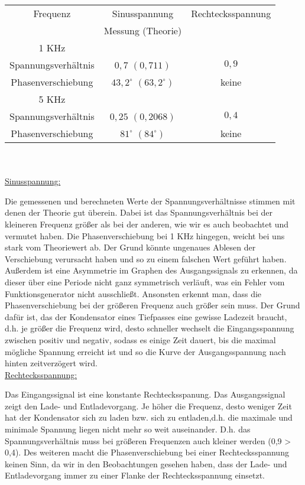 \documentclass[paper=a4, fontsize=11pt]{scrartcl}
\numberwithin{equation}{section}
\numberwithin{figure}{section}
\numberwithin{table}{section}
\begin{document}
\begin{tabular}{|c|c|c|}
\hline
Frequenz & Sinusspannung & Rechtecksspannung \\
 & Messung (Theorie)&  \\
\hline
1 KHz & & \\  
Spannungsverhältnis & $0,7$ $(0,711)$  & $0,9$ \\
Phasenverschiebung & $43,2^{\circ}$ $(63,2^{\circ})$ & keine \\
\hline
5 KHz & & \\
Spannungsverhältnis & $0,25$ $(0,2068)$ & $0,4$ \\
Phasenverschiebung & $81^{\circ}$ $(84^{\circ})$ & keine \\
\hline
\end{tabular} \\

\\

\underline{Sinusspannung:}

Die gemessenen und berechneten Werte der Spannungsverhältnisse stimmen mit denen der Theorie gut überein. Dabei ist das Spannungsverhältnis bei der kleineren Frequenz größer als bei der anderen, wie wir es auch beobachtet und vermutet haben. Die Phasenverschiebung bei 1 KHz hingegen, weicht bei uns stark vom Theoriewert ab. Der Grund könnte ungenaues Ablesen der Verschiebung verursacht haben und so zu einem falschen Wert geführt haben. Außerdem ist eine Asymmetrie im Graphen des Ausgangssignals zu erkennen, da dieser über eine Periode nicht ganz symmetrisch verläuft, was ein Fehler vom Funktionsgenerator nicht ausschließt. Ansonsten erkennt man, dass die Phasenverschiebung bei der größeren Frequenz auch größer sein muss. Der Grund dafür ist, das der Kondensator eines Tiefpasses eine gewisse Ladezeit braucht, d.h. je größer die Frequenz wird, desto schneller wechselt die Eingangsspannung zwischen positiv und negativ, sodass es einige Zeit dauert, bis die maximal mögliche Spannung erreicht ist und so die Kurve der Ausgangsspannung nach hinten zeitverzögert wird. \\

\underline{Rechtecksspannung:}

Das Eingangssignal ist eine konstante Rechtecksspanung. Das Ausgangssignal zeigt den Lade- und Entladevorgang. Je höher die Frequenz, desto weniger Zeit hat der Kondensator sich zu laden bzw. sich zu entladen,d.h. die maximale und minimale Spannung liegen nicht mehr so weit auseinander. D.h. das Spannungsverhältnis muss bei größeren Frequenzen auch kleiner werden (0,9 > 0,4). 
Des weiteren macht die Phasenverschiebung bei einer Rechtecksspannung keinen Sinn, da wir in den Beobachtungen gesehen haben, dass der Lade- und Entladevorgang immer zu einer Flanke der Rechtecksspannung einsetzt. \\
\end{document}
